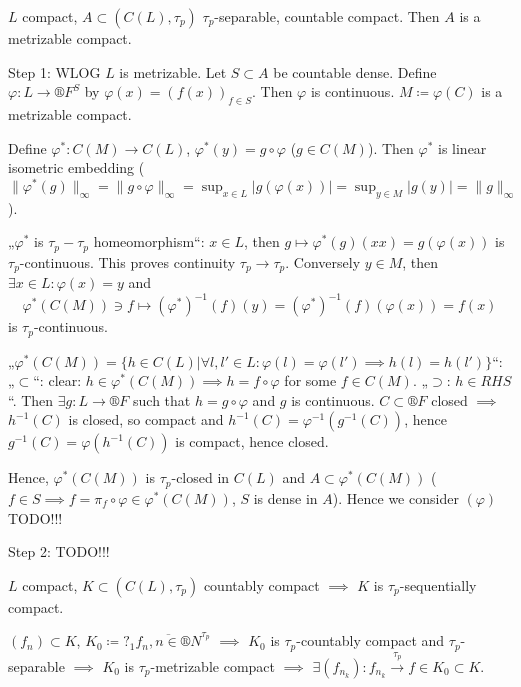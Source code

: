 \documentclass[12pt]{article}					%
\begin{document}
\begin{lemma}
	$L$ compact, $A \subset (C(L), τ_p)$ $τ_p$-separable, countable compact. Then $A$ is a metrizable compact.

	\begin{dukazin}
		Step 1: WLOG $L$ is metrizable. Let $S \subset A$ be countable dense. Define $φ: L \rightarrow ®F^S$ by $φ(x) = (f(x))_{f \in S}$. Then $φ$ is continuous. $M \coloneq φ(C)$ is a metrizable compact.


		Define $φ^*: C(M) \rightarrow C(L)$, $φ^*(y) = g ∘ φ$ ($g \in C(M)$). Then $φ^*$ is linear isometric embedding ($\|φ^*(g)\|_∞ = \|g∘φ\|_∞ = \sup_{x \in L} |g(φ(x))| = \sup_{y \in M} |g(y)| = \|g\|_∞$).

		„$φ^*$ is $τ_p-τ_p$ homeomorphism“: $x \in L$, then $g \mapsto φ^*(g)(xx) = g(φ(x))$ is $τ_p$-continuous. This proves continuity $τ_p \rightarrow τ_p$. Conversely $y \in M$, then $\exists x \in L: φ(x) = y$ and
		$$ φ^*(C(M)) \ni f \mapsto (φ^*)^{-1} (f)(y) = (φ^*)^{-1}(f)(φ(x)) = f(x) $$
		is $τ_p$-continuous.

		„$φ^*(C(M)) = \{h \in C(L) | \forall l, l' \in L: φ(l) = φ(l') \implies h(l) = h(l')\}$“: „$\subset$“: clear: $h \in φ^*(C(M)) \implies h = f∘φ$ for some $f \in C(M)$. „$\supset$: $h \in RHS$“. Then $\exists g: L \rightarrow ®F$ such that $h = g ∘ φ$ and $g$ is continuous. $C \subset ®F$ closed $\implies$ $h^{-1}(C)$ is closed, so compact and $h^{-1}(C) = φ^{-1}(g^{-1}(C))$, hence $g^{-1}(C) = φ(h^{-1}(C))$ is compact, hence closed.

		Hence, $φ^*(C(M))$ is $τ_p$-closed in $C(L)$ and $A \subset φ^*(C(M))$ ($f \in S \implies f = π_f ∘ φ \in φ^*(C(M))$, $S$ is dense in $A$). Hence we consider $(φ)$ TODO!!!

		Step 2: TODO!!!
	\end{dukazin}
\end{lemma}

\begin{lemma}[Smulyan]
	$L$ compact, $K \subset (C(L), τ_p)$ countably compact $\implies$ $K$ is $τ_p$-sequentially compact.
	
	\begin{dukazin}
		$(f_n) \subset K$, $K_0 \coloneq ?_1 \overline{f_n, n \in ®N}^{τ_p}$ $\implies$ $K_0$ is $τ_p$-countably compact and $τ_p$-separable $\implies$ $K_0$ is $τ_p$-metrizable compact $\implies$ $\exists (f_{n_k}): f_{n_k} \overset{τ_p}\rightarrow f \in K_0 \subset K$.
	\end{dukazin}
\end{lemma}
\end{document}
